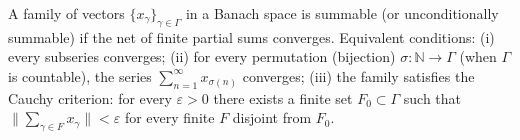 A family of vectors $\{x_\gamma\}_{\gamma \in \Gamma}$ in a Banach space is summable (or unconditionally summable) if the net of finite partial sums converges. Equivalent conditions: (i) every subseries converges; (ii) for every permutation (bijection) $\sigma: \mathbb{N} \to \Gamma$ (when $\Gamma$ is countable), the series $\sum_{n=1}^{\infty} x_{\sigma(n)}$ converges; (iii) the family satisfies the Cauchy criterion: for every $\varepsilon > 0$ there exists a finite set $F_0 \subset \Gamma$ such that $\|\sum_{\gamma \in F} x_\gamma\| < \varepsilon$ for every finite $F$ disjoint from $F_0$.
